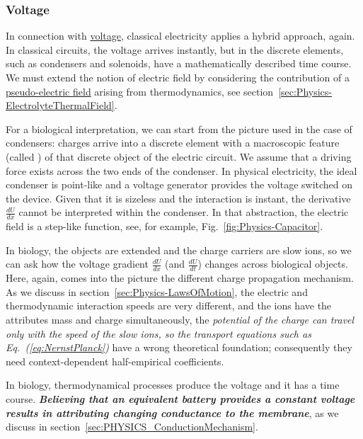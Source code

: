                                    
\subsubsection[Voltage]{Voltage\label{sec:PHYSICS_VOLTAGE}}

In connection with \href{http://hyperphysics.phy-astr.gsu.edu/hbase/hframe.html}{voltage},
classical electricity applies a hybrid approach, again. 
In classical circuits, the voltage arrives instantly, but 
in the discrete elements, such as condensers and solenoids,
have a mathematically described time course.
We must extend the notion of electric field by considering 
the contribution of a \hyperlink{ThermodynamicElectricField}{pseudo-electric field} arising from thermodynamics, see 
section~\ref{sec:Physics-ElectrolyteThermalField}.

For a biological interpretation, we can start from the picture
used in the case of condensers: charges arrive into a discrete element
with a macroscopic feature (called ) of that
 discrete object of the electric circuit. We assume that a driving force exists across the two ends of the condenser. In physical electricity, the ideal condenser is point-like and a voltage generator provides the voltage switched on the device. Given that it is sizeless and the interaction is instant, the derivative $\frac{dU}{dx}$ cannot be interpreted within the condenser. In that abstraction, the electric field is a step-like function, see, for example, Fig.~\ref{fig:Physics-Capacitor}. 
 
In biology, the objects are extended and the charge carriers are slow ions, so we can ask how the \hypertarget{voltage_gradient}{voltage gradient} $\frac{dU}{dx}$ (and $\frac{dU}{dt}$) changes
across biological objects. Here, again, comes into the picture the different charge propagation mechanism. As we discuss in section~\ref{sec:Physics-LawsOfMotion}, the electric and thermodynamic interaction speeds are very different, and the ions have the attributes mass and charge simultaneously, the \textit{potential of the charge
can travel only with the speed of the slow ions, so the transport equations such as Eq.~(\ref{eq:NernstPlanck})} have a wrong theoretical foundation; consequently they need context-dependent half-empirical coefficients.

In biology, thermodynamical processes produce the voltage and it has a time course. \textit{\textbf{Believing that an equivalent battery provides
a constant voltage results in attributing changing conductance
to the membrane}}, as we discuss in section~\ref{sec:PHYSICS_ConductionMechanism}.


